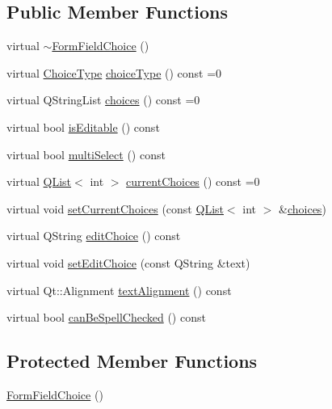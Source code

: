 \subsection*{Public Member Functions}
\begin{DoxyCompactItemize}
\item 
virtual \hyperlink{classOkular_1_1FormFieldChoice_adde27c51c466e1098f2637d5ac645e84}{$\sim$\+Form\+Field\+Choice} ()
\item 
virtual \hyperlink{classOkular_1_1FormFieldChoice_a40b3939793e805c34303dff8262a17b3}{Choice\+Type} \hyperlink{classOkular_1_1FormFieldChoice_ae6c02629fc4e317d45624676d36659ec}{choice\+Type} () const =0
\item 
virtual Q\+String\+List \hyperlink{classOkular_1_1FormFieldChoice_aeb4047c2c4b3b1c06b06e615c073f923}{choices} () const =0
\item 
virtual bool \hyperlink{classOkular_1_1FormFieldChoice_a3d9978586fb90b5cf91357816d93f193}{is\+Editable} () const 
\item 
virtual bool \hyperlink{classOkular_1_1FormFieldChoice_a9040f9e1f608efb93843797c51a3551f}{multi\+Select} () const 
\item 
virtual \hyperlink{classQList}{Q\+List}$<$ int $>$ \hyperlink{classOkular_1_1FormFieldChoice_a7715f0a6629d8d874c22f436a62165ed}{current\+Choices} () const =0
\item 
virtual void \hyperlink{classOkular_1_1FormFieldChoice_a04709d9348dffe9de80178b9be2f2521}{set\+Current\+Choices} (const \hyperlink{classQList}{Q\+List}$<$ int $>$ \&\hyperlink{classOkular_1_1FormFieldChoice_aeb4047c2c4b3b1c06b06e615c073f923}{choices})
\item 
virtual Q\+String \hyperlink{classOkular_1_1FormFieldChoice_a63c046d413e912c3b2873bfb25ab83f9}{edit\+Choice} () const 
\item 
virtual void \hyperlink{classOkular_1_1FormFieldChoice_a4d1604d12cc73427f22e923b250532c6}{set\+Edit\+Choice} (const Q\+String \&text)
\item 
virtual Qt\+::\+Alignment \hyperlink{classOkular_1_1FormFieldChoice_a0eeb0db3e3709fcc7bb0f53635a08852}{text\+Alignment} () const 
\item 
virtual bool \hyperlink{classOkular_1_1FormFieldChoice_a2c408d22d15516f9dd972aa20fe19d86}{can\+Be\+Spell\+Checked} () const 
\end{DoxyCompactItemize}
\subsection*{Protected Member Functions}
\begin{DoxyCompactItemize}
\item 
\hyperlink{classOkular_1_1FormFieldChoice_a4095fc17baff789a1ce8cd169489ffb1}{Form\+Field\+Choice} ()
\end{DoxyCompactItemize}


